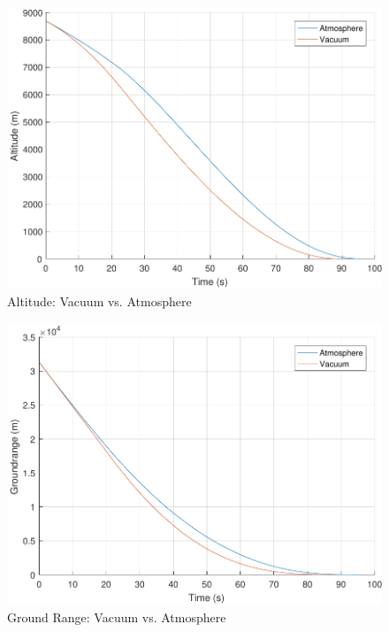 \begin{figure}[H]
	\centering
	\begin{minipage}{4.3 in}
		\includegraphics[width=\linewidth]{Figures/altatmovsvac.pdf}
		\caption{Altitude: Vacuum vs. Atmosphere \label{fig:altatmovsvac} }
	\end{minipage}
\end{figure}

\begin{figure}[H]
	\centering
	\begin{minipage}{4.3 in}
		\includegraphics[width=\linewidth]{Figures/rngatmovsvac.pdf}
		\caption{Ground Range: Vacuum vs. Atmosphere \label{fig:rngatmovsvac} }
	\end{minipage}
\end{figure}

